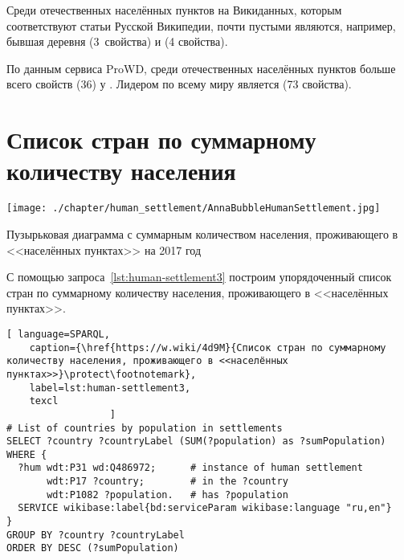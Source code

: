 Среди отечественных населённых пунктов на Викиданных, 
которым соответствуют статьи Русской Википедии, 
почти пустыми являются, например, 
бывшая деревня  (3~свойства) 
и  (4 свойства).

По данным сервиса ProWD, 
среди отечественных населённых пунктов 
больше всего свойств (36) у . 
Лидером по всему миру является  (73 свойства)\autocite{humansettlements_ProWD}.



\newpage
\section{Список стран по суммарному количеству населения}

\begin{marginfigure}[0.0cm]
    \texttt{[image: ./chapter/human\_settlement/AnnaBubbleHumanSettlement.jpg]}
    \caption[Сколько населения проживает в населённых пунктах, 2017.]{Пузырьковая диаграмма с суммарным количеством населения, проживающего в <<населённых пунктах>> на 2017 год} 
    \label{fig:human-settlement-1}
\end{marginfigure}

С помощью запроса~\ref{lst:human-settlement3} 
построим упорядоченный список стран по суммарному количеству населения, проживающего в <<населённых пунктах>>.


\lstset{numbers=left, firstnumber=1, frame=single}
\begin{lstlisting}[ language=SPARQL, 
    caption={\href{https://w.wiki/4d9M}{Список стран по суммарному количеству населения, проживающего в <<населённых пунктах>>}\protect\footnotemark},
    label=lst:human-settlement3,
    texcl 
                  ]
# List of countries by population in settlements
SELECT ?country ?countryLabel (SUM(?population) as ?sumPopulation)
WHERE {
  ?hum wdt:P31 wd:Q486972;      # instance of human settlement
       wdt:P17 ?country;        # in the ?country
       wdt:P1082 ?population.   # has ?population
  SERVICE wikibase:label{bd:serviceParam wikibase:language "ru,en"}
}
GROUP BY ?country ?countryLabel 
ORDER BY DESC (?sumPopulation)
\end{lstlisting}%


